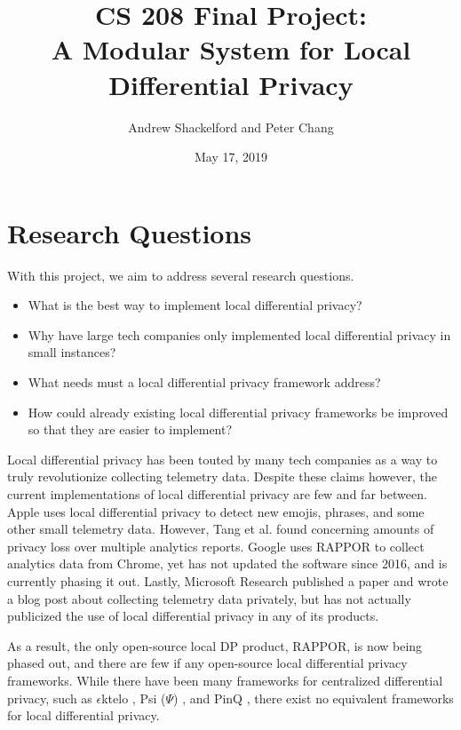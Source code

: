 \documentclass[12pt]{article}
\title{CS 208 Final Project:\\ A Modular System for Local Differential Privacy}
\author{Andrew Shackelford and Peter Chang}
\date{May 17, 2019}
\theoremstyle{definition}
\begin{document}
\maketitle

{
  \hypersetup{linkcolor=black, hidelinks}
  \tableofcontents
}

\newpage

\section{Research Questions}

\noindent

With this project, we aim to address several research questions.

\begin{itemize}
    \item What is the best way to implement local differential privacy?
    \item Why have large tech companies only implemented local differential privacy in small instances?
    \item What needs must a local differential privacy framework address?
    \item How could already existing local differential privacy frameworks be improved so that they are easier to implement?
\end{itemize}

Local differential privacy has been touted by many tech companies as a way to truly revolutionize collecting telemetry data. Despite these claims however, the current implementations of local differential privacy are few and far between. Apple \cite{apple} uses local differential privacy to detect new emojis, phrases, and some other small telemetry data. However, Tang et al. \cite{tang_et_al} found concerning amounts of privacy loss over multiple analytics reports. Google \cite{google} uses RAPPOR to collect analytics data from Chrome, yet has not updated the software since 2016, and is currently phasing it out. Lastly, Microsoft Research \cite{microsoft} published a paper and wrote a blog post about collecting telemetry data privately, but has not actually publicized the use of local differential privacy in any of its products.

\bigskip

As a result, the only open-source local DP product, RAPPOR, is now being phased out, and there are few if any open-source local differential privacy frameworks. While there have been many frameworks for centralized differential privacy, such as $\epsilon$ktelo \cite{ektelo}, Psi ($\Psi$) \cite{psi}, and PinQ \cite{pinq}, there exist no equivalent frameworks for local differential privacy.
\end{document}
